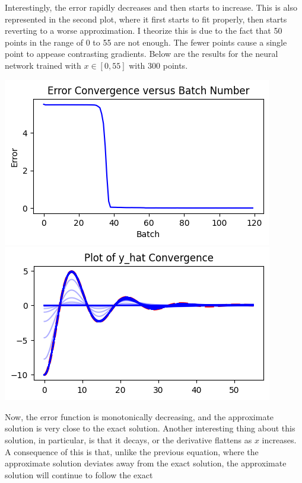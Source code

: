 \documentclass[12pt]{article}
\begin{document}
\begin{description}
\begin{minipage}{\linewidth}
    \end{minipage}
    Interestingly, the error rapidly decreases and then starts to increase.
    This is also represented in the second plot, where it first starts to fit
    properly, then starts reverting to a worse approximation. I theorize this
    is due to the fact that 50 points in the range of 0 to 55 are not enough.
    The fewer points cause a single point to appease contrasting gradients.
    Below are the results for the neural network trained with $x\in[0, 55]$
    with $300$ points. \\
    \begin{minipage}{\linewidth}
        \centering
        \includegraphics[scale=.5]{images/figure15.png}
        \includegraphics[scale=.5]{images/figure16.png}
    \end{minipage}
    Now, the error function is monotonically decreasing, and the approximate
    solution is very close to the exact solution. Another interesting thing
    about this solution, in particular, is that it decays, or the derivative
    flattens as $x$ increases. A consequence of this is that, unlike the
    previous equation, where the approximate solution deviates away from the
    exact solution, the approximate solution will continue to follow the exact

\end{description}
\end{document}
